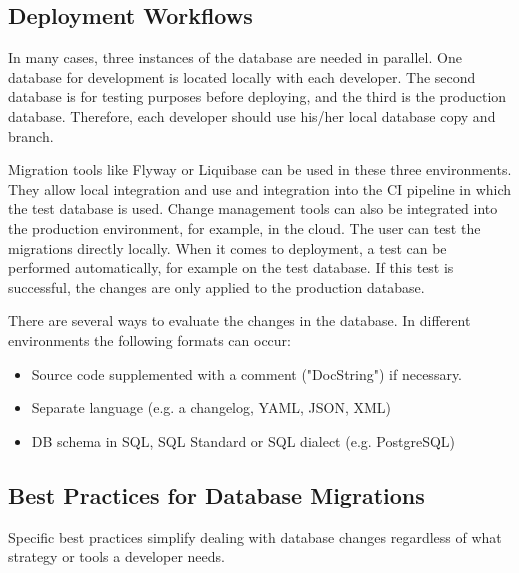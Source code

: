 \subsection{Deployment Workflows}
%
In many cases, three instances of the database are needed in parallel. One database for development is located locally with each developer. The second database is for testing purposes before deploying, and the third is the production database. Therefore, each developer should use his/her local database copy and branch.

Migration tools like Flyway or Liquibase can be used in these three environments. They allow local integration and use and integration into the CI pipeline in which the test database is used. Change management tools can also be integrated into the production environment, for example, in the cloud. The user can test the migrations directly locally. When it comes to deployment, a test can be performed automatically, for example on the test database. If this test is successful, the changes are only applied to the production database.

%

There are several ways to evaluate the changes in the database. In different environments the following formats can occur:
\begin{itemize}
	\item Source code supplemented with a comment ("DocString") if necessary.
	\item Separate language (e.g. a changelog, YAML, JSON, XML)
	\item DB schema in SQL, SQL Standard or SQL dialect (e.g. PostgreSQL)
\end{itemize}


\subsection{Best Practices for Database Migrations \label{best_practices}}%
%
Specific best practices simplify dealing with database changes regardless of what strategy or tools a developer needs.

